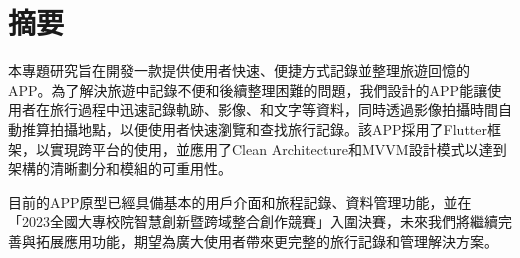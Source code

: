 \section{摘要}

本專題研究旨在開發一款提供使用者快速、便捷方式記錄並整理旅遊回憶的APP。為了解決旅遊中記錄不便和後續整理困難的問題，我們設計的APP能讓使用者在旅行過程中迅速記錄軌跡、影像、和文字等資料，同時透過影像拍攝時間自動推算拍攝地點，以便使用者快速瀏覽和查找旅行記錄。該APP採用了Flutter框架，以實現跨平台的使用，並應用了Clean Architecture和MVVM設計模式以達到架構的清晰劃分和模組的可重用性。

目前的APP原型已經具備基本的用戶介面和旅程記錄、資料管理功能，並在「2023全國大專校院智慧創新暨跨域整合創作競賽」入圍決賽，未來我們將繼續完善與拓展應用功能，期望為廣大使用者帶來更完整的旅行記錄和管理解決方案。